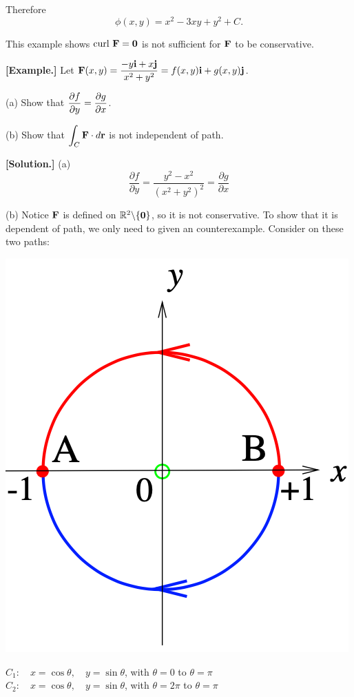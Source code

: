 \documentclass[11pt, a4paper]{MATH2023}
\newcommand{\eg}{\textbf{[Example.] }}
\newcommand{\sol}{\textbf{[Solution.] }}
\newcommand{\FF}{{\bf F}}
\newcommand{\curl}{{\rm curl\ }}
\begin{document}
\begin{spacing}{1.3}
    Therefore $$\phi(x, y)=x^2-3xy+y^2+C.$$

    \newpage
    {\blue This example shows $\curl \FF={\bf 0}$ is not sufficient for $\FF$ to be conservative.}

    \eg Let $\displaystyle \mathbf{F}(x, y)=\frac{-y \mathbf{i}+x \mathbf{j}}{x^{2}+y^{2}}=f(x, y) \mathbf{i}+g(x, y) \mathbf{j}$.
    
    (a) Show that $\displaystyle \frac{\partial f}{\partial y}=\frac{\partial g}{\partial x}$.

    (b) Show that $\displaystyle \int_{C} \mathbf{F} \cdot d \mathbf{r}$ is not independent of path.
    
    \sol (a)$$\frac{\partial f}{\partial y}=\frac{y^{2}-x^{2}}{\left(x^{2}+y^{2}\right)^{2}}=\frac{\partial g}{\partial x}$$

    (b) Notice $\FF$ is defined on $\mathbb{R}^2\backslash \{{\bf 0}\}$, so it is not conservative.
    To show that it is dependent of path, we only need to given an counterexample. Consider on these two paths:
    \begin{center}
        \includegraphics[scale=0.4]{images/Ch15-ex2.3.png}
    \end{center}
    $C_{1}: \quad x=\cos \theta, \quad y=\sin \theta$, with $\theta = 0$ to $\theta = \pi$\\
    $C_{2}: \quad x=\cos \theta, \quad y=\sin \theta$, with $\theta = 2\pi$ to $\theta = \pi$


\end{spacing}
\end{document}
